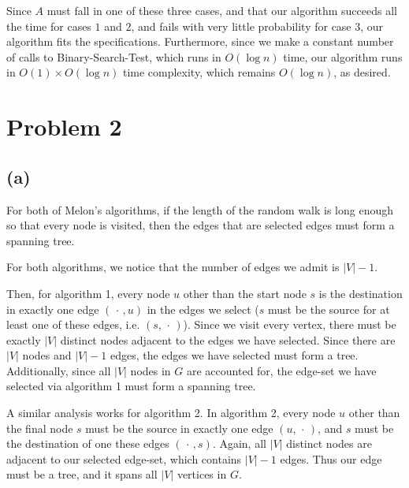 \documentclass{6046}
\begin{document}
\vspace{1.5em}

Since $A$ must fall in one of these three cases,
and that our algorithm succeeds all the time
for cases $1$ and $2$, and fails
with very little probability for case $3$,
our algorithm fits the specifications. Furthermore,
since we make a constant number of calls to {\sc Binary-Search-Test},
which runs in $O(\log n)$ time, our algorithm runs in
$O(1) \times O(\log n)$ time complexity, which remains $O(\log n)$,
as desired.

\section*{Problem 2}
\subsection*{(a)}
For both of Melon's algorithms, if the length of the random walk
is long enough so that every node is visited, then the edges
that are selected edges must form a spanning tree.

For both algorithms, we notice that the number of edges
we admit is $|V| - 1$.

Then, for algorithm 1, every node $u$ other
than the start node $s$ is the destination in exactly one
edge $(\,\cdot\,, u)$ in the edges we select ($s$ must
be the source for at least one of these edges, i.e.
$(s, \,\cdot\,)$). Since we visit every vertex, there must be exactly
$|V|$ distinct nodes adjacent to the edges we have selected.
Since there are $|V|$ nodes and $|V| - 1$ edges, the edges
we have selected must form a tree. Additionally, since
all $|V|$ nodes in $G$ are accounted for, the edge-set
we have selected via algorithm 1 must form a spanning tree.

A similar analysis works for algorithm 2. In algorithm 2,
every node $u$ other than the final node $s$ must be
the source in exactly one edge $(u, \,\cdot\,)$, and $s$
must be the destination of one these edges $(\,\cdot\,, s)$.
Again, all $|V|$ distinct nodes are adjacent to our selected
edge-set, which contains $|V| - 1$ edges. Thus our edge must
be a tree, and it spans all $|V|$ vertices in $G$.
\end{document}
